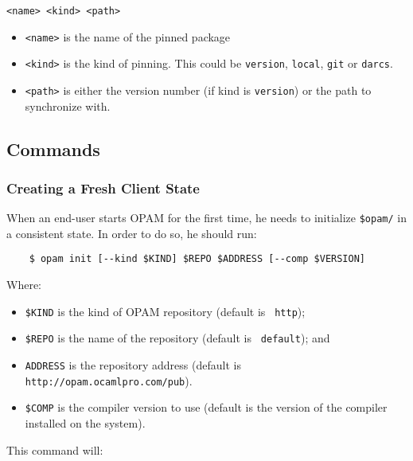 \documentclass[a4paper,11pt]{article}
\begin{document}
\begin{Verbatim}
<name> <kind> <path>
\end{Verbatim}

\begin{itemize}
\item \verb+<name>+ is the name of the pinned package

\item \verb+<kind>+ is the kind of pinning. This could be \verb+version+,
\verb+local+, \verb+git+ or \verb+darcs+.

\item \verb+<path>+ is either the version number (if kind is
  \verb+version+) or the path to synchronize with.
\end{itemize}

\subsection{Commands}

\subsubsection{Creating a Fresh Client State}
\label{opam-init}

When an end-user starts OPAM for the first time, he needs to
initialize \verb+$opam/+ in a consistent state. In order to do so, he
should run:

\begin{verbatim}
    $ opam init [--kind $KIND] $REPO $ADDRESS [--comp $VERSION]
\end{verbatim}

Where:
\begin{itemize}
\item \verb+$KIND+ is the kind of OPAM repository (default is {\tt
  http});
\item \verb+$REPO+ is the name of the repository (default is {\tt
  default}); and
\item \verb+ADDRESS+ is the repository address (default is
  \verb+http://opam.ocamlpro.com/pub+).
\item \verb+$COMP+ is the compiler version to use (default is the
  version of the compiler installed on the system).
\end{itemize}

This command will:
\end{document}

